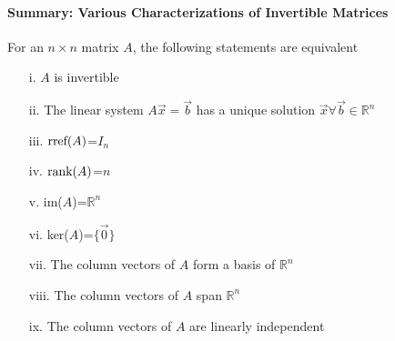 \documentclass[10pt]{report}
\newcommand{\rref}{\textup{rref}}
\newcommand{\rank}{\textup{rank}}
\begin{document}
\paragraph{Summary: Various Characterizations of Invertible Matrices}
For an $n\times n$ matrix $A$, the following statements are equivalent
\begin{itemize}
\item[i.] $A$ is invertible
\item[ii.] The linear system $A\vec{x}=\vec{b}$ has a unique solution $\vec{x}\forall \vec{b}\in \mathbb{R}^n$
\item[iii.] $\rref(A)$=$I_n$
\item[iv.] $\rank(A)$=$n$
\item[v.] im($A$)=$\mathbb{R}^n$
\item[vi.] ker($A$)=$\{\vec{0}\}$
\item[vii.] The column vectors of $A$ form a basis of $\mathbb{R}^n$
\item[viii.] The column vectors of $A$ span $\mathbb{R}^n$
\item[ix.] The column vectors of $A$ are linearly independent
\end{itemize}
\end{document}
